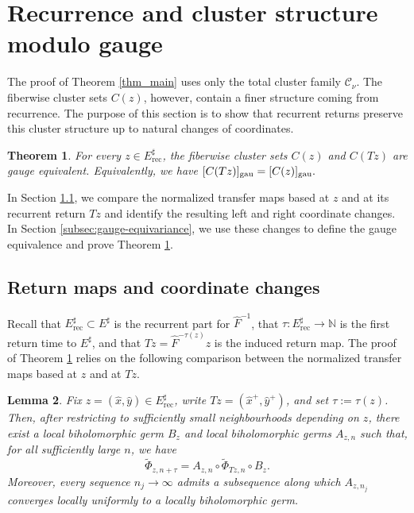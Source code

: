 \documentclass[11pt]{amsart}
\numberwithin{equation}{section}
\theoremstyle{plain}
\newtheorem{thm}{Theorem}[section]
\newtheorem{lem}[thm]{Lemma}
\theoremstyle{definition}
\theoremstyle{remark}
\begin{document}
\section{Recurrence and cluster structure modulo gauge}
\label{sec:cluster-gauge}
The proof of Theorem \ref{thm_main} uses only the total cluster
family $\mathcal C_\nu$. The fiberwise cluster sets $C(z)$,
however, contain a finer structure coming from recurrence. The
purpose of this section is to show that recurrent returns preserve
this cluster structure up to natural changes of coordinates.

\begin{thm}\label{thm:cluster-gauge-equivariance}
For every $z\in E^\sharp_{\mathrm{rec}}$, the fiberwise cluster sets
$C(z)$ and $C(Tz)$ are gauge equivalent. Equivalently, we have
$
[C(Tz)]_{\rm gau}
=
[C(z)]_{\rm gau}.
$
\end{thm}

In Section \ref{subsec:return-gauge}, we compare the normalized
transfer maps based at $z$ and at its recurrent return $Tz$ and
identify the resulting left and right coordinate changes.
In Section \ref{subsec:gauge-equivariance}, we use these changes to
define the
gauge equivalence
and prove Theorem
\ref{thm:cluster-gauge-equivariance}.


\subsection{Return maps and coordinate changes}
\label{subsec:return-gauge}
Recall that
$E^\sharp_{\mathrm{rec}}\subset E^\sharp$ is the recurrent part for
$\hat F^{-1}$, that
$\tau\colon E^\sharp_{\mathrm{rec}}\to\mathbb N$ is the first return
time to $E^\sharp$, and that
$Tz=\hat F^{-\tau(z)}z$ is the induced return map.
The proof of Theorem \ref{thm:cluster-gauge-equivariance} relies on
the following comparison
between the normalized transfer maps based at $z$ and at $Tz$.

\begin{lem}\label{lem:return-equivar}
Fix $z=(\hat x,\hat y)\in E^\sharp_{\mathrm{rec}}$, write
$Tz=(\hat x^+,\hat y^+)$, and set $\tau:=\tau(z)$. Then, after
restricting to sufficiently small neighbourhoods depending on $z$,
there exist a local biholomorphic germ $B_z$ and local
biholomorphic germs $A_{z,n}$ such that, for all sufficiently large
$n$, we have
\begin{equation}\label{eq:tilde-gauge}
\widetilde\Phi_{z,n+\tau}
=
A_{z,n}\circ
\widetilde\Phi_{Tz,n}\circ B_z.
\end{equation}
Moreover, every sequence $n_j\to\infty$ admits a subsequence along
which $A_{z,n_j}$ converges locally uniformly to a locally
biholomorphic germ.
\end{lem}
\end{document}
